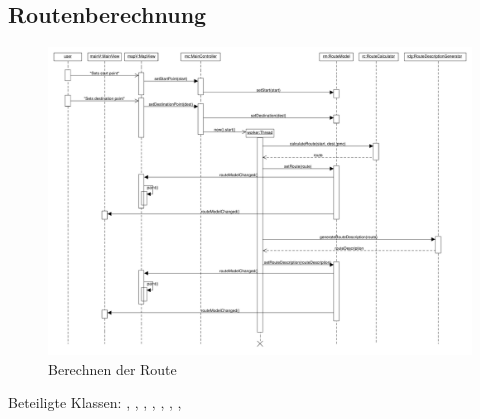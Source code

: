 \documentclass[a4paper, 11pt]{article}
\begin{document}
\subsection{Routenberechnung}
\begin{figure}[H]
\centering
\includegraphics[angle=90, height=\textheight]{RouteCalculationSequenz}
\caption{Berechnen der Route}
\label{fig:sequenz_routeCalculation}
\end{figure}
Beteiligte Klassen: , , , , , , , 
\end{document}
